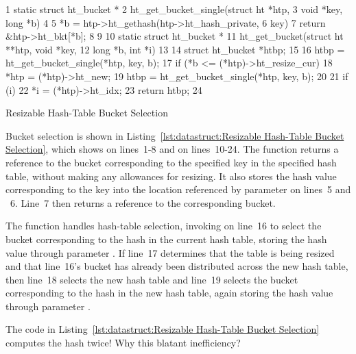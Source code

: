 \begin{listing}[tb]
{ \scriptsize
\begin{verbbox}
 1 static struct ht_bucket *
 2 ht_get_bucket_single(struct ht *htp,
 3                      void *key, long *b)
 4 {
 5   *b = htp->ht_gethash(htp->ht_hash_private,
 6                        key) %
 7   return &htp->ht_bkt[*b];
 8 }
 9 
10 static struct ht_bucket *
11 ht_get_bucket(struct ht **htp, void *key,
12               long *b, int *i)
13 {
14   struct ht_bucket *htbp;
15 
16   htbp = ht_get_bucket_single(*htp, key, b);
17   if (*b <= (*htp)->ht_resize_cur) {
18     *htp = (*htp)->ht_new;
19     htbp = ht_get_bucket_single(*htp, key, b);
20   }
21   if (i)
22     *i = (*htp)->ht_idx;
23   return htbp;
24 }
\end{verbbox}
}
\centering
\theverbbox
\caption{Resizable Hash-Table Bucket Selection}
\label{lst:datastruct:Resizable Hash-Table Bucket Selection}
\end{listing}

Bucket selection is shown in
Listing~\ref{lst:datastruct:Resizable Hash-Table Bucket Selection},
which shows  on lines~1-8 and
 on lines~10-24.
The  function returns a reference to the bucket
corresponding to the specified key in the specified hash table, without
making any allowances for resizing.
It also stores the hash value corresponding to the key into the location
referenced by parameter  on lines~5 and ~6.
Line~7 then returns a reference to the corresponding bucket.

The  function handles hash-table selection, invoking
 on line~16 to select the bucket
corresponding to the hash in the current
hash table, storing the hash value through parameter .
If line~17 determines that the table is being resized and that
line~16's bucket has already been distributed across the new hash
table, then line~18 selects the new hash table and line~19
selects the bucket corresponding to the hash in the new hash table,
again storing the hash value through parameter .

\QuickQuiz{}
	The code in
	Listing~\ref{lst:datastruct:Resizable Hash-Table Bucket Selection}
	computes the hash twice!
	Why this blatant inefficiency?
 \QuickQuizEnd

